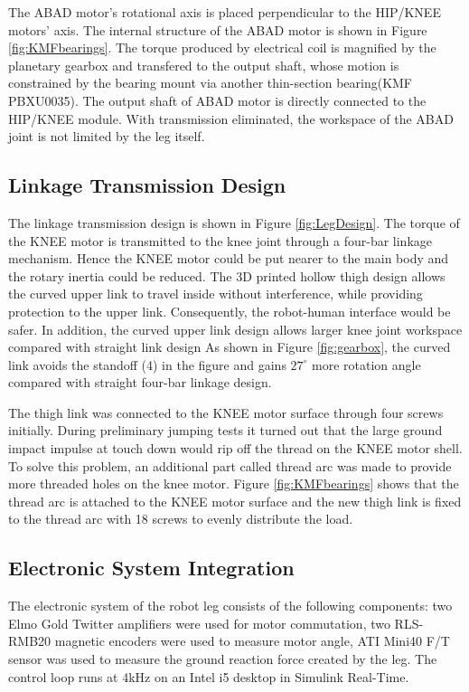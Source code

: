 The ABAD motor's rotational axis is placed perpendicular to the HIP/KNEE motors' axis. The internal structure of the ABAD motor is shown in Figure \ref{fig:KMFbearings}. The torque produced by electrical coil is magnified by the planetary gearbox and transfered to the output shaft, whose motion is constrained by the bearing mount via another thin-section bearing(KMF PBXU0035). The output shaft of ABAD motor is directly connected to the HIP/KNEE module. With transmission eliminated, the workspace of the ABAD joint is not limited by the leg itself. 

\subsection{\textbf{Linkage Transmission Design}}
\label{sec:legDesign}

The linkage transmission design is shown in Figure \ref{fig:LegDesign}. The torque of the KNEE motor is transmitted to the knee joint through a four-bar linkage mechanism. Hence the KNEE motor could be put nearer to the main body and the rotary inertia could be reduced. The 3D printed hollow thigh design allows the curved upper link to travel inside without interference, while providing protection to the upper link. Consequently, the robot-human interface would be safer. In addition, the curved upper link design allows larger knee joint workspace compared with straight link design As shown in Figure \ref{fig:gearbox}, the curved link avoids the standoff (4) in the figure and gains $27^{\circ}$ more rotation angle compared with straight four-bar linkage design.

The thigh link was connected to the KNEE motor surface through four screws initially. During preliminary jumping tests it turned out that the large ground impact impulse at touch down would rip off the thread on the KNEE motor shell. To solve this problem, an additional part called thread arc was made to provide more threaded holes on the knee motor. Figure \ref{fig:KMFbearings} shows that the thread arc is attached to the KNEE motor surface and the new thigh link is fixed to the thread arc with 18 screws to evenly distribute the load.

\subsection{\textbf{Electronic System Integration}}
\label{sec:Electronics}

The electronic system of the robot leg consists of the following components: two Elmo Gold Twitter amplifiers were used for motor commutation, two RLS-RMB20 magnetic encoders were used to measure motor angle, ATI Mini40 F/T sensor was used to measure the ground reaction force created by the leg. The control loop runs at 4kHz on an Intel i5 desktop in Simulink Real-Time. 


